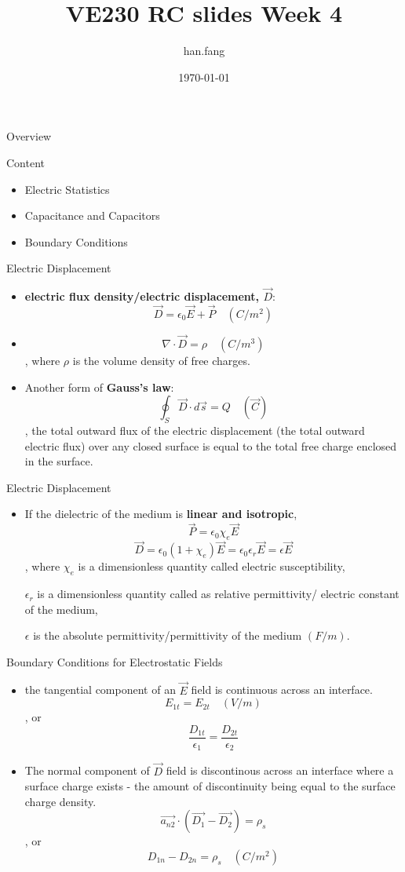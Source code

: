 \documentclass[xcolor={dvipsnames}]{beamer}
\title[VE230 RC slides week 1]{VE230 RC slides Week 4}
\author{han.fang }
\date{\today}
\begin{document}
\begin{frame}
\titlepage
\end{frame}
\begin{frame}{Overview}
\begin{block}{Content}
	\begin{itemize}
		\item Electric Statistics
		\item Capacitance and Capacitors
		\item Boundary Conditions
	\end{itemize}
\end{block}
\end{frame}
\begin{frame}{Electric Displacement}
\begin{itemize}
  \item \textbf{electric flux density/electric displacement, $\vec{D}$}:
  $$\vec{D} = \epsilon_0 \vec{E} + \vec{P} \quad (C/m^2)$$
  \item $$\nabla\cdot \vec{D} = \rho \quad (C/m^3)$$, where $\rho$ is the volume density of free charges.
  \item Another form of \textbf{Gauss's law}:
  $$\oint_S \vec{D} \cdot d\vec{s} = Q \quad (\vec{C})$$,
  the total outward flux of the electric displacement (the total outward electric flux) over any closed surface is equal to the total free charge enclosed in the surface.

\end{itemize}
\end{frame}
\begin{frame}{Electric Displacement}
\begin{itemize}
  \item If the dielectric of the medium is \textbf{linear and isotropic},
  $$\vec{P} = \epsilon_0 \chi_e \vec{E}$$
  $$\vec{D} = \epsilon_0 (1+\chi_e)\vec{E} = \epsilon_0\epsilon_r\vec{E} = \epsilon\vec{E}$$,
  where $\chi_e$ is a dimensionless quantity called electric susceptibility, 
  
  $\epsilon_r$ is a dimensionless quantity called as relative permittivity/ electric constant of the medium,
  
  $\epsilon$ is the absolute permittivity/permittivity of the medium $(F/m)$.
\end{itemize}
\end{frame}
\begin{frame}{Boundary Conditions for Electrostatic Fields}
\begin{itemize}
  \item the tangential component of an $\vec{E}$ field is continuous across an interface.
  $$E_{1t} = E_{2t} \quad (V/m)$$, or
  $$\frac{D_{1t}}{\epsilon_1} = \frac{D_{2t}}{\epsilon_2}$$
  \item The normal component of $\vec{D}$ field is discontinous across an interface where a surface charge exists - the amount of discontinuity being equal to the surface charge density. 
  $$\vec{a_{n2}}\cdot(\vec{D_1} - \vec{D_2}) = \rho_s$$, or
  $$D_{1n} - D_{2n} = \rho_s \quad (C/m^2)$$
\end{itemize}
\end{frame}
\end{document}
